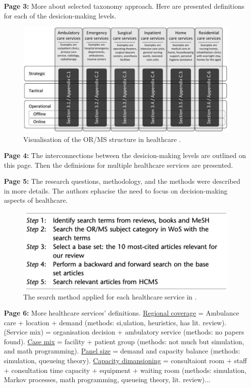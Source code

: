     \textbf{Page 3:}
    More about selected taxonomy approach. Here are presented definitions for each of the desicion-making levels.
    \begin{figure}[H]
        \centering
        \includegraphics[width=1\textwidth]{figures/0011_SR03NL12/fig1.png}
        \caption{Visualisation of the OR/MS structure in healthcare \cite{x029}.}
        \label{fig1:0011_SR03NL12}
    \end{figure}

    \textbf{Page 4:}
    The interconnections between the desicion-making levels are outlined on this page. Then the definisions for multiple healthcare services are presented.

    \textbf{Page 5:}
    The research questions, methodology, and the methods were described in more details. The authors ephacise the need to focus on decision-making aspects of healthcare.
    \begin{figure}[H]
        \centering
        \includegraphics[width=1\textwidth]{figures/0011_SR03NL12/fig2.png}
        \caption{The search method applied for each healthcare service in \cite{x029}.}
        \label{fig2:0011_SR03NL12}
    \end{figure}
    
    \textbf{Page 6:}
    More healthcare services' definitions. \underline{Regional coverage} = Ambulance care + location + demand (methods: si,ulation, heuristics, has lit. review). \underline(Service mix) = organisation decision + ambulatory service (methods: no papers found). \underline{Case mix} = facility + patient group (methods: not much but simulation, and math programming). \underline{Panel size} = demand and capacity balance (methods: simulation, queueing theory). \underline{Capacity dimansioning} = consultaiont room + staff + consultation time capacity + equipment + waiting room (methods: simulation, Markov processes, math programming, queueing theory, lit. review)...
    
